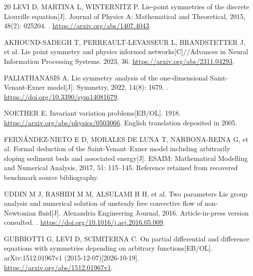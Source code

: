 \documentclass[11pt]{article}
\theoremstyle{definition}
\begin{document}
\begin{thebibliography}{20}
LEVI D, MARTINA L, WINTERNITZ P. Lie-point symmetries of the discrete
Liouville equation[J]. Journal of Physics A: Mathematical and Theoretical,
2015, 48(2): 025204.
.
\url{https://arxiv.org/abs/1407.4043}.

AKHOUND-SADEGH T, PERREAULT-LEVASSEUR L, BRANDSTETTER J, et al.
Lie point symmetry and physics informed networks[C]//Advances in Neural
Information Processing Systems. 2023, 36.
\url{https://arxiv.org/abs/2311.04293}.

PALIATHANASIS A. Lie symmetry analysis of the one-dimensional
Saint-Venant-Exner model[J]. Symmetry, 2022, 14(8): 1679.
.
\url{https://doi.org/10.3390/sym14081679}.

NOETHER E. Invariant variation problems[EB/OL]. 1918.
\url{https://arxiv.org/abs/physics/0503066}.
English translation deposited in 2005.

FERN{\'A}NDEZ-NIETO E D, MORALES DE LUNA T, NARBONA-REINA G, et al.
Formal deduction of the Saint-Venant--Exner model including arbitrarily
sloping sediment beds and associated energy[J]. ESAIM: Mathematical
Modelling and Numerical Analysis, 2017, 51: 115--145.
Reference retained from recovered benchmark source bibliography.

UDDIN M J, RASHIDI M M, ALSULAMI H H, et al. Two parameters Lie group
analysis and numerical solution of unsteady free convective flow of
non-Newtonian fluid[J]. Alexandria Engineering Journal, 2016.
Article-in-press version consulted.
.
\url{https://doi.org/10.1016/j.aej.2016.05.009}.

GUBBIOTTI G, LEVI D, SCIMITERNA C. On partial differential and difference
equations with symmetries depending on arbitrary functions[EB/OL].
arXiv:1512.01967v1 (2015-12-07)[2026-10-19].
\url{https://arxiv.org/abs/1512.01967v1}.


\end{thebibliography}
\end{document}
